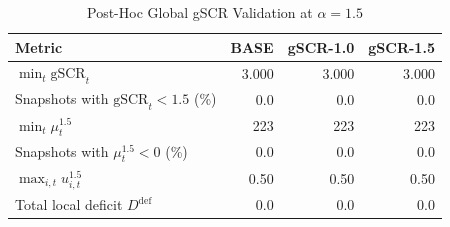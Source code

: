 \begin{table}[!t]
\centering
\caption{Post-Hoc Global gSCR Validation at \(\alpha=1.5\)}
\label{tab:strength_validation}
\renewcommand{\arraystretch}{1.08}
\begin{tabular}{lrrr}
\toprule
Metric & BASE & gSCR-1.0 & gSCR-1.5 \\
\midrule
\(\min_t \mathrm{gSCR}_t\)                  & 3.000 & 3.000 & 3.000 \\
Snapshots with \(\mathrm{gSCR}_t<1.5\) (\%) & 0.0 & 0.0 & 0.0 \\
\(\min_t \mu_t^{1.5}\)                      & 223 & 223 & 223 \\
Snapshots with \(\mu_t^{1.5}<0\) (\%)       & 0.0 & 0.0 & 0.0 \\
\(\max_{i,t} u_{i,t}^{1.5}\)                & 0.50 & 0.50 & 0.50 \\
Total local deficit \(D^{\mathrm{def}}\)    & 0.0 & 0.0 & 0.0 \\
\bottomrule
\end{tabular}
\end{table}
